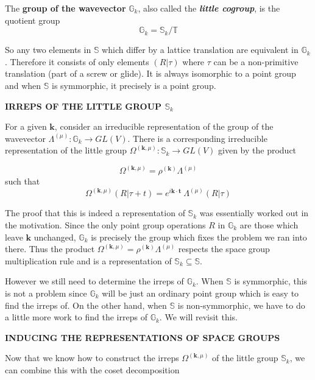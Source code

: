 \documentclass[9 pt]{report}
\def\*#1{\boldsymbol{#1}}
\begin{document}
\begin{tcolorbox}
	The \textbf{{group of the wavevector}} $\mathbb{G}_k$, also called the \textbf{\emph{little cogroup}}, is the quotient group
	$$ \mathbb{G}_k = \mathbb{S}_k / \mathbb{T} $$
\end{tcolorbox}
	So any two elements in $\mathbb{S}$ which differ by a lattice translation are equivalent in $\mathbb{G}_k$. Therefore it consists of only elements $(R|\tau)$ where $\tau$ can be a non-primitive translation (part of a screw or glide). It is always isomorphic to a point group and when $\mathbb{S}$ is symmorphic, it precisely is a point group.
	
\begin{center}
	\textbf{IRREPS OF THE LITTLE GROUP $\mathbb{S}_k$}
\end{center}
	
\begin{tcolorbox}
	For a given $\*k$, consider an irreducible representation of the group of the wavevector $\Lambda^{(\mu)}:\mathbb{G}_k \to GL(V)$. There is a corresponding irreducible representation of the little group $\Omega^{(\*k,\mu)}:\mathbb{S}_k\to GL(V)$ given by the product
	
	$$ \Omega^{(\*k,\mu)} = \rho^{(\*k)} \Lambda^{(\mu)} $$
	such that
	$$ \Omega^{(\*k,\mu)}(R|\tau + t) = e^{i\*k\cdot\*t}\:\Lambda^{(\mu)}(R|\tau) $$
\end{tcolorbox}
The proof that this is indeed a representation of $\mathbb{S}_k$ was essentially worked out in the motivation. Since the only point group operations $R$ in $\mathbb{G}_k$ are those which leave $\*k$ unchanged, $\mathbb{G}_k$ is precisely the group which fixes the problem we ran into there. Thus the product $\Omega^{(\*k,\mu)}=\rho^{(\*k)}\Lambda^{(\mu)}$ respects the space group multiplication rule and is a representation of $\mathbb{S}_k \subseteq \mathbb{S}$.

However we still need to determine the irreps of $\mathbb{G}_k$. When $\mathbb{S}$ is symmorphic, this is not a problem since $\mathbb{G}_k$ will be just an ordinary point group which is easy to find the irreps of. On the other hand, when $\mathbb{S}$ is non-symmorphic, we have to do a little more work to find the irreps of $\mathbb{G}_k$. We will revisit this.


\begin{center}
	\textbf{INDUCING THE REPRESENTATIONS OF SPACE GROUPS}
\end{center}


Now that we know how to construct the irreps $\Omega^{(\*k,\mu)}$ of the little group $\mathbb{S}_k$, we can combine this with the coset decomposition
\end{document}
